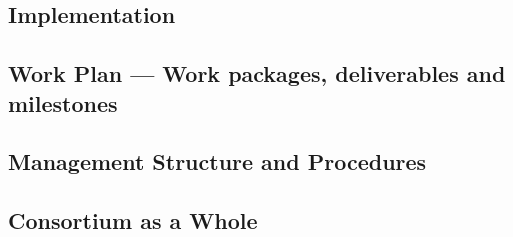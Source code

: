 \documentclass[
  deliverables,
  longtasklabels,
  noworkareas,
  svgnames,
  \classoptions
]{euproposal}       %
\begin{document}
\begin{proposal}
\draftpage


\draftpage


\draftpage
\clearpage


\draftpage
\clearpage


\clearpage


\section{Implementation}

\subsection{Work Plan --- Work packages, deliverables and milestones}
\label{sect:workplan}

\newpage

\subsection{Management Structure and Procedures}


\draftpage
\subsection{Consortium as a Whole}

\draftpage


\end{proposal}
\end{document}
